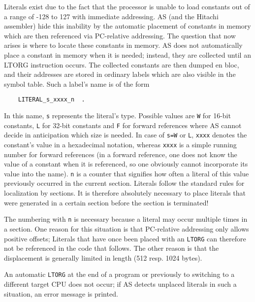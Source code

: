 \documentclass[12pt,twoside]{report}
\newcommand{\tty}[1]{{\tt #1}}
\begin{document}
Literals exist due to the fact that the processor is unable to load
constants out of a range of -128 to 127 with immediate addressing.
AS (and the Hitachi assembler) hide this inability by the automatic
placement of constants in memory which are then referenced via
PC-relative addressing.  The question that now arises is where to
locate these constants in memory.  AS does not automatically place a
constant in memory when it is needed; instead, they are collected
until an LTORG instruction occurs.  The collected constants are then
dumped en bloc, and their addresses are stored in ordinary labels
which are also visible in the symbol table.  Such a label's name is
of the form
\begin{verbatim}
    LITERAL_s_xxxx_n  .
\end{verbatim}
In this name, \tty{s} represents the literal's type.  Possible values are
\tty{W} for 16-bit constants, \tty{L} for 32-bit constants and \tty{F} for
forward references where AS cannot decide in anticipation which size is
needed.  In case of \tty{s=W} or \tty{L}, \tty{xxxx} denotes the
constant's value in a hexadecimal notation, whereas \tty{xxxx} is a simple
running number for forward references (in a forward reference, one does
not know the value of a constant when it is referenced, so one obviously
cannot incorporate its value into the name).  \tty{n} is a counter that
signifies how often a literal of this value previously occurred in the
current section.  Literals follow the standard rules for localization by
sections.  It is therefore absolutely necessary to place literals that
were generated in a certain section before the section is terminated!

The numbering with \tty{n} is necessary because a literal may occur
multiple times in a section.  One reason for this situation is that
PC-relative addressing only allows positive offsets; Literals that
have once been placed with an \tty{LTORG} can therefore not be referenced
in the code that follows.  The other reason is that the displacement
is generally limited in length (512 resp. 1024 bytes).

An automatic \tty{LTORG} at the end of a program or previously to
switching to a different target CPU does not occur; if AS detects unplaced
literals in such a situation, an error message is printed.
\end{document}
